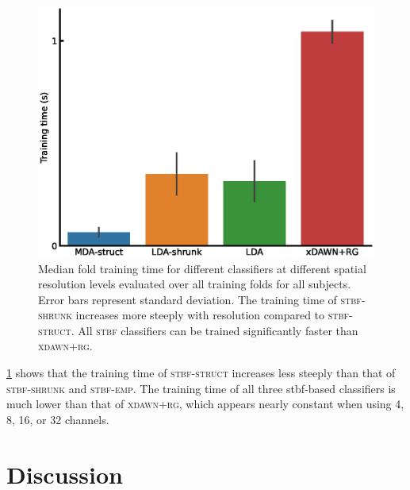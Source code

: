 	\begin{figure}
		\includegraphics[width=.66\linewidth]{figures/stbf_struct/training_time.eps}
    \caption[Classifier training time.]{Median fold training time for different classifiers at different spatial
			resolution levels evaluated over all training folds for all subjects.
			Error bars represent standard deviation. The training time of \textsc{stbf-shrunk} increases more
			steeply with resolution compared to \textsc{stbf-struct}.
			All \textsc{stbf} classifiers can be trained significantly faster than
			\textsc{xdawn+rg}.}
		\label{fig:training_time}
	\end{figure}

	\cref{fig:training_time} shows that the training time of
	\textsc{stbf-struct} increases less steeply than that of \textsc{stbf-shrunk}
	and \textsc{stbf-emp}. The training time of all three \ac{stbf}-based classifiers is
	much lower than that of \textsc{xdawn+rg}, which appears nearly constant when using
	4, 8, 16, or 32 channels.

	\section{Discussion}

